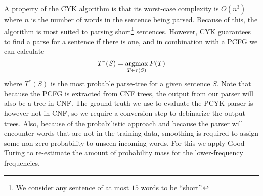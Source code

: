 \documentclass[11pt,twocolumn]{article}
\newcommand{\argmax}{\operatornamewithlimits{argmax}}
\begin{document}
		A property of the CYK algorithm is that its worst-case complexity is $O(n^3)$ where $n$
		is the number of words in the sentence being parsed. Because of this, the algorithm is
		most suited to parsing short\footnote{We consider any sentence of at most $15$ words to
		be ``short''.} sentences. However, CYK guarantees to find a parse for a sentence if there
		is one, and in combination with a PCFG we can calculate \[T^*(S) = \argmax_{T \in \tau(S)}P(T)\]
		where $T^*(S)$ is the most probable parse-tree for a given sentence $S$. Note that because
		the PCFG is extracted from CNF trees, the output from our parser will also be a tree in CNF.
		The ground-truth we use to evaluate the PCYK parser is however not in CNF, so we require
		a conversion step to debinarize the output trees. Also, because of the probabilistic
		approach and because the parser will encounter words that are not in the training-data,
		smoothing is required to assign some non-zero probability to unseen incoming words.
		For this we apply Good-Turing to re-estimate the amount of probability mass for the
		lower-frequency frequencies.
\end{document}
